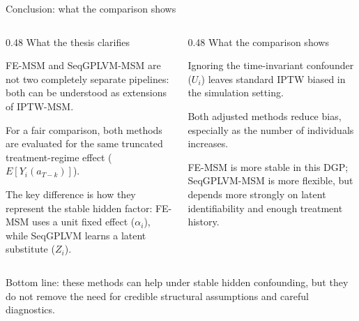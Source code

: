 \documentclass[aspectratio=169,12pt]{beamer}
\newcommand{\red}[1]{\textcolor{PrimerRed}{#1}}
\newcommand{\teal}[1]{\textcolor{PrimerTeal}{#1}}
\newcommand{\spacedparagraph}[1]{\par\noindent\begin{minipage}{0.96\linewidth}\RaggedRight #1\end{minipage}\par\vspace{0.55em}}
\begin{document}
\begin{frame}{Conclusion: what the comparison shows}
\vspace{-0.15cm}

\begin{columns}[T,onlytextwidth]

\begin{column}{0.48\textwidth}
{\fontsize{11}{14}\selectfont\teal{What the thesis clarifies}}\par
\vspace{0.25cm}

{\fontsize{9.4}{12.0}\selectfont
\spacedparagraph{FE-MSM and SeqGPLVM-MSM are not two completely separate pipelines: both can be understood as extensions of IPTW-MSM.}

\spacedparagraph{For a fair comparison, both methods are evaluated for the same truncated treatment-regime effect ($E[Y_i(a_{T-k})]$).}

\spacedparagraph{The key difference is how they represent the stable hidden factor: FE-MSM uses a unit fixed effect ($\alpha_i$), while SeqGPLVM learns a latent substitute ($Z_i$).}
}
\end{column}

\begin{column}{0.48\textwidth}
{\fontsize{11}{14}\selectfont\teal{What the comparison shows}}\par
\vspace{0.25cm}

{\fontsize{9.4}{12.0}\selectfont
\spacedparagraph{Ignoring the time-invariant confounder ($U_i$) leaves standard IPTW biased in the simulation setting.}

\spacedparagraph{Both adjusted methods reduce bias, especially as the number of individuals increases.}

\spacedparagraph{FE-MSM is more stable in this DGP; SeqGPLVM-MSM is more flexible, but depends more strongly on latent identifiability and enough treatment history.}
}
\end{column}

\end{columns}

\vspace{0.28cm}

{\fontsize{10.2}{13.5}\selectfont\RaggedRight
\red{Bottom line:} these methods can help under stable hidden confounding, but they do not remove the need for credible structural assumptions and careful diagnostics.\par}

\end{frame}
\end{document}
